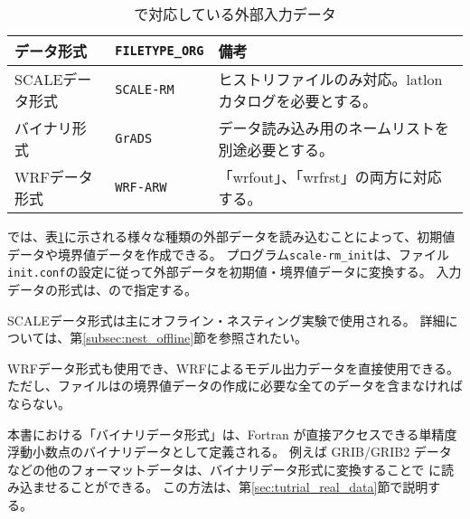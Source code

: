 \section{\SecInputDataSetting} \label{sec:adv_datainput}

\begin{table}[htb]
\begin{center}
\caption{\scalelib で対応している外部入力データ}
\begin{tabularx}{150mm}{|l|l|X|} \hline
 \rowcolor[gray]{0.9} データ形式      & \verb|FILETYPE_ORG|  & 備考 \\ \hline
 SCALEデータ形式   & \verb|SCALE-RM|     &  ヒストリファイルのみ対応。latlonカタログを必要とする。 \\ \hline
 バイナリ形式 & \verb|GrADS|        & データ読み込み用のネームリストを別途必要とする。       \\ \hline
 WRFデータ形式     & \verb|WRF-ARW|      & 「wrfout」、「wrfrst」の両方に対応する。          \\ \hline
\end{tabularx}
\label{tab:inputdata_format}
\end{center}
\end{table}

\scalerm では、表\ref{tab:inputdata_format}に示される様々な種類の外部データを読み込むことによって、初期値データや境界値データを作成できる。
プログラム\verb|scale-rm_init|は、ファイル\verb|init.conf|の設定に従って外部データを初期値・境界値データに変換する。
入力データの形式は、ので指定する。

SCALEデータ形式は主にオフライン・ネスティング実験で使用される。
詳細については、第\ref{subsec:nest_offline}節を参照されたい。

WRFデータ形式も使用でき、WRFによるモデル出力データを直接使用できる。
ただし、ファイルは{\scalerm}の境界値データの作成に必要な全てのデータを含まなければならない。

本書における「バイナリデータ形式」は、Fortran が直接アクセスできる単精度浮動小数点のバイナリデータとして定義される。
例えば GRIB/GRIB2 データなどの他のフォーマットデータは、バイナリデータ形式に変換することで {\scalerm} に読み込ませることができる。
この方法は、第\ref{sec:tutrial_real_data}節で説明する。


